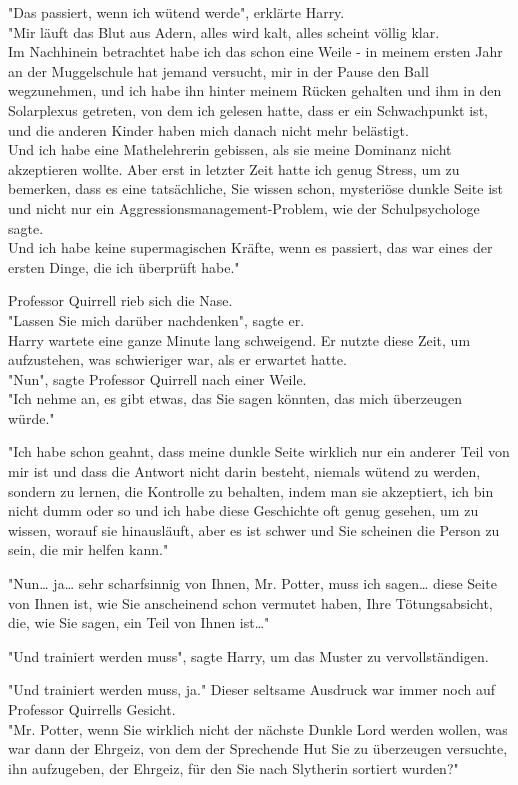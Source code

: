 {"Das passiert, wenn ich wütend werde", erklärte Harry.\\ "Mir läuft das Blut aus Adern, alles wird kalt, alles scheint völlig klar.\\ Im Nachhinein betrachtet habe ich das schon eine Weile - in meinem ersten Jahr an der Muggelschule hat jemand versucht, mir in der Pause den Ball wegzunehmen, und ich habe ihn hinter meinem Rücken gehalten und ihm in den Solarplexus getreten, von dem ich gelesen hatte, dass er ein Schwachpunkt ist, und die anderen Kinder haben mich danach nicht mehr belästigt.\\ Und ich habe eine Mathelehrerin gebissen, als sie meine Dominanz nicht akzeptieren wollte. Aber erst in letzter Zeit hatte ich genug Stress, um zu bemerken, dass es eine tatsächliche, Sie wissen schon, mysteriöse dunkle Seite ist und nicht nur ein Aggressionsmanagement-Problem, wie der Schulpsychologe sagte.\\ Und ich habe keine supermagischen Kräfte, wenn es passiert, das war eines der ersten Dinge, die ich überprüft habe."

Professor Quirrell rieb sich die Nase.\\ "Lassen Sie mich darüber nachdenken", sagte er.\\ Harry wartete eine ganze Minute lang schweigend. Er nutzte diese Zeit, um aufzustehen, was schwieriger war, als er erwartet hatte.\\ "Nun", sagte Professor Quirrell nach einer Weile.\\ "Ich nehme an, es gibt etwas, das Sie sagen könnten, das mich überzeugen würde."

"Ich habe schon geahnt, dass meine dunkle Seite wirklich nur ein anderer Teil von mir ist und dass die Antwort nicht darin besteht, niemals wütend zu werden, sondern zu lernen, die Kontrolle zu behalten, indem man sie akzeptiert, ich bin nicht dumm oder so und ich habe diese Geschichte oft genug gesehen, um zu wissen, worauf sie hinausläuft, aber es ist schwer und Sie scheinen die Person zu sein, die mir helfen kann."

"Nun… ja… sehr scharfsinnig von Ihnen, Mr. Potter, muss ich sagen… diese Seite von Ihnen ist, wie Sie anscheinend schon vermutet haben, Ihre Tötungsabsicht, die, wie Sie sagen, ein Teil von Ihnen ist…"

"Und trainiert werden muss", sagte Harry, um das Muster zu vervollständigen.

"Und trainiert werden muss, ja." Dieser seltsame Ausdruck war immer noch auf Professor Quirrells Gesicht.\\ "Mr. Potter, wenn Sie wirklich nicht der nächste Dunkle Lord werden wollen, was war dann der Ehrgeiz, von dem der Sprechende Hut Sie zu überzeugen versuchte, ihn aufzugeben, der Ehrgeiz, für den Sie nach Slytherin sortiert wurden?"

}
